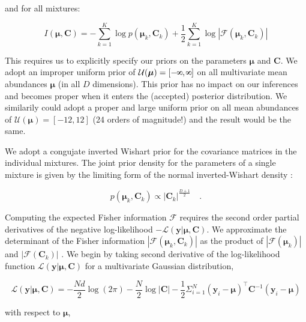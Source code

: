 \documentclass{aastex61}
\newcommand{\vect}[1]{\boldsymbol{\mathbf{#1}}}
\def\infinity{\rotatebox{90}{8}}
\def\veccov{\vect{C}}
\def\vecmean{\vect{\mu}}
\def\datum{y}
\def\data{\vect{\datum}}
\def\likelihood{\mathcal{L}}
\begin{document}
\noindent{}and for all mixtures:

\begin{equation}
I(\vecmean,\veccov) = -\sum_{k=1}^{K}\log{p(\vecmean_k,\veccov_k)} + \frac{1}{2}\sum_{k=1}^{K}\log{|\mathcal{F}\left(\vecmean_k,\veccov_k\right)|}
\end{equation}

This requires us to explicitly specify our priors on the parameters $\vecmean$
and $\veccov$.
We adopt an improper uniform prior of 
$\mathcal{U}(\vecmean) = [-\infinity, \infinity]$ on all multivariate mean 
abundances $\vecmean$ (in all $D$ dimensions).
This prior has no impact on our inferences and becomes proper when it enters 
the (accepted) posterior distribution. 
We similarily could adopt a proper and large uniform prior on all mean 
abundances of $\mathcal{U}(\vecmean) = [-12, 12]$ (24 orders of magnitude!) 
and the result would be the same.


We adopt a congujate inverted Wishart prior for the covariance matrices in the
individual mixtures. 
The joint prior density for the parameters of a single
mixture is given by the limiting form of the normal inverted-Wishart
density \citep[e.g., Section 5.2.3 of ][]{Schafer_1990}:

\begin{equation}
    p(\vecmean_k,\veccov_k) \propto |\veccov_k|^{\frac{D + 1}{2}} \quad .
\end{equation}


Computing the expected Fisher information $\mathcal{F}$ requires the second 
order partial derivatives of the negative log-likelihood 
$-\likelihood(\data|\vecmean,\veccov)$.
We approximate the determinant of the Fisher information 
$|\mathcal{F}(\vecmean_k, \veccov_k)|$ as the product of 
$|\mathcal{F}\left(\vecmean_k\right)|$ and $|\mathcal{F}\left(\veccov_k\right)|$ 
\citep{Oliver_1996,Roberts_1998}. 
We begin by taking second derivative of the log-likelihood function
$\likelihood\left(\data|\vecmean,\veccov\right)$ for a multivariate Gaussian
distribution,

\begin{equation}
  \likelihood\left(\data|\vecmean, \veccov\right) = 
  -\frac{Nd}{2}\log{\left(2\pi\right)} - \frac{N}{2}\log{|\veccov|} - \frac{1}{2}\Sigma_{i=1}^{N}\left(\data_i - \vecmean\right)^\intercal{}\veccov^{-1}\left(\bm{y}_i - \vecmean\right)
\end{equation}

\noindent{}with respect to $\vecmean$,
\end{document}
